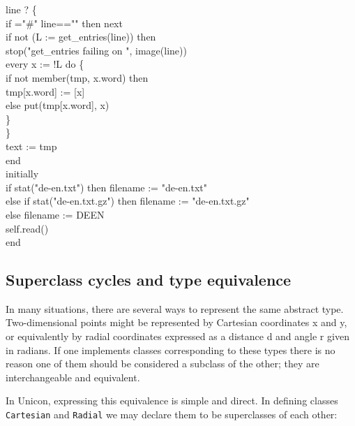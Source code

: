 {\>\>\>	 line ? \{ \\
\>\>\>\>	    if ="\#" {\textbar} line=="" then next \\
\>\>\>\>	    if not (L := get\_entries(line)) then \\
\>\>\>\>\>	       stop("get\_entries failing on ", image(line)) \\
\>\>\>\>	    every x := !L do \{ \\
\>\>\>\>\>	       if not member(tmp, x.word) then \\
\>\>\>\>\>\>		  tmp[x.word] := [x] \\
\>\>\>\>\>	       else put(tmp[x.word], x) \\
\>\>\>\>\>	       \} \\
\>\>\>\>	    \} \\
\>\>      text := tmp \\
\>   end \\
initially \\
\>   if stat("de-en.txt") then filename := "de-en.txt" \\
\>   else if stat("de-en.txt.gz") then filename := "de-en.txt.gz" \\
\>   else filename := DEEN \\
\>   self.read() \\
end
}



\subsection*{Superclass cycles and type equivalence}

In many situations, there are several ways to represent the same
abstract type. Two-dimensional points might be represented by
Cartesian coordinates x and y, or
equivalently by radial coordinates expressed as a distance d and angle
r given in radians. If one implements classes
corresponding to these types there is no reason one of them should be
considered a subclass of the other; they are interchangeable and
equivalent.

In Unicon, expressing this equivalence is simple and direct. In defining
classes \texttt{Cartesian} and \texttt{Radial} we may declare them to
be superclasses of each other: 


